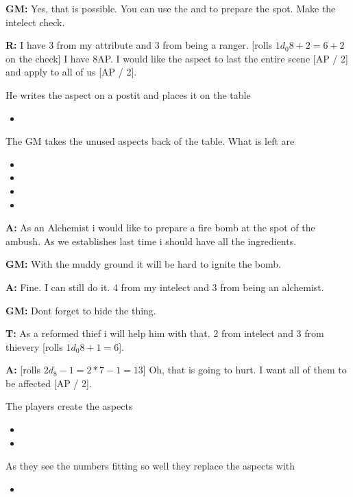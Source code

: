 \documentclass[11pt]{article}
\begin{document}
{\textbf{GM:} Yes, that is possible. You can use the  and  to prepare the spot. Make the intelect check.

\textbf{R:} I have 3 from my attribute and 3 from being a ranger. [rolls \(1 d_0 8 + 2 = 6 + 2\) on the check] I have 8AP. I would like the aspect to last the entire scene [AP / 2] and apply to all of us [AP / 2].

He writes the aspect on a postit and places it on the table
\begin{itemize}
\item {}
\end{itemize}
The GM takes the unused aspects back of the table. What is left are
\begin{itemize}
\item {}
\item {}
\item {}
\item {}
\end{itemize}

\textbf{A:} As an Alchemist i would like to prepare a fire bomb at the spot of the ambush. As we establishes last time i should have all the ingredients.

\textbf{GM:} With the muddy ground it will be hard to ignite the bomb.

\textbf{A:} Fine. I can still do it. 4 from my intelect and 3 from being an alchemist.

\textbf{GM:} Dont forget to hide the thing.

\textbf{T:} As a reformed thief i will help him with that. 2 from intelect and 3 from thievery [rolls \(1 d_0 8 + 1 = 6\)].

\textbf{A:} {[}rolls \(2 d_8 - 1 = 2*7 -1 = 13\)] Oh, that is going to hurt. I want all of them to be affected [AP / 2].

The players create the aspects
\begin{itemize}
\item {}
\item {}
\end{itemize}
As they see the numbers fitting so well they replace the aspects with
\begin{itemize}
\item {}
\end{itemize}

}
\end{document}
